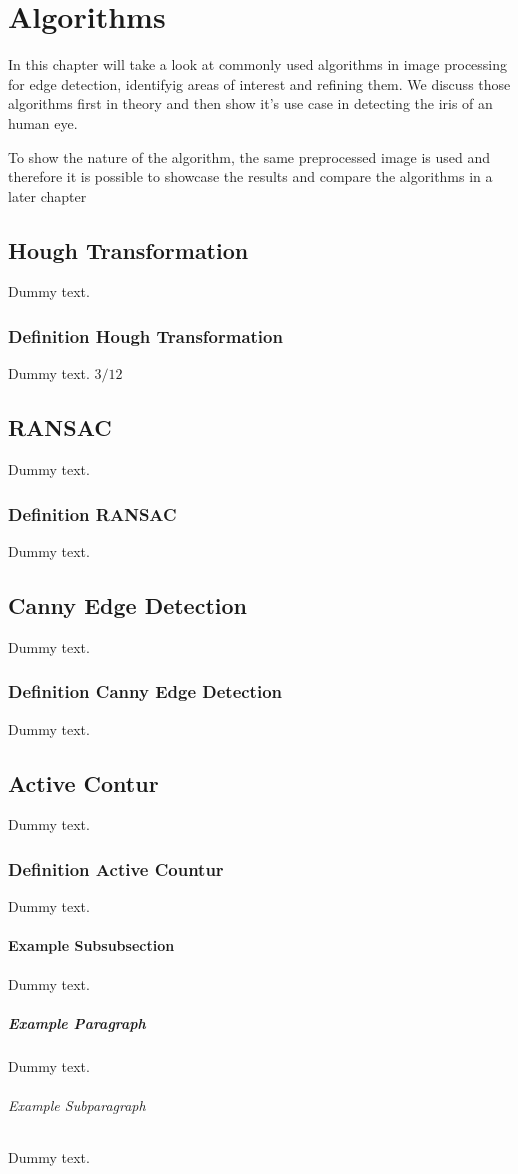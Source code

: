 \chapter{Algorithms}

In this chapter will take a look at commonly used algorithms in image processing for edge detection, identifyig areas of interest and refining them. 
We discuss those algorithms first in theory and then show it's use case in detecting the iris of an human eye. 

To show the nature of the algorithm, the same preprocessed image is used and therefore it is possible to showcase the results and compare the algorithms in a later chapter
\section{Hough Transformation}

Dummy text.

\subsection{Definition Hough Transformation }

Dummy text.
$ 3/12$ 
\section{RANSAC}

Dummy text.

\subsection{Definition RANSAC}

Dummy text.


\section{Canny Edge Detection}

Dummy text.

\subsection{Definition Canny Edge Detection}

Dummy text.

\section{Active Contur}

Dummy text.

\subsection{Definition Active Countur}

Dummy text.

\subsubsection{Example Subsubsection}

Dummy text.

\paragraph{Example Paragraph}

Dummy text.

\subparagraph{Example Subparagraph}

Dummy text.
